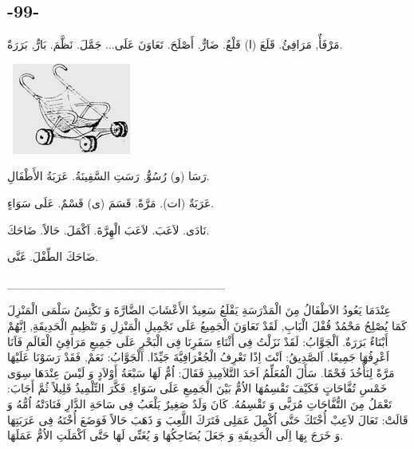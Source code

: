 \documentclass[a5paper]{article}
\begin{document}
\subsection[-99-]{-99-}
مَرْفَأٌ, مَرَافِئُ. قَلَعَ (ا) قَلْعٌ. ضَارٌّ. أَصْلَحَ. تَعَاوَنَ عَلَى... جَمَّلَ. نَظَّمَ. بَارٌّ, بَرَرَةٌ.

\  \includegraphics[width=1.5311in,height=1.1772in]{images/MuhammadBagauddinprettified-img273.png} 

رَسَا (و) رُسُوٌّ. رَسَتِ السَّفِينَةُ. عَرَبَةُ الأَطْفَالِ.

عَرَبَةٌ (ات). مَرَّةً. قَسَمَ (ى) قَسْمٌ. عَلَى سَوَاءٍ.

نَادَى. لاَعَبَ. لاَعَبَ الْهِرَّةَ. اَكْمَلَ. حَالاً. ضَاحَكَ.

ضَاحَكَ الطِّفْلَ. غَنَّى.

\_\_\_\_\_\_\_\_\_\_\_\_\_\_\_\_\_\_\_\_\_\_\_\_\_\_

عِنْدَمَا يَعُودُ الاَطْفَالُ مِنَ الْمَدْرَسَةِ يَقْلَعُ سَعِيدٌ الأَعْشَابَ الضَّارَّةَ وَ تَكْنِسُ سَلْمَى الْمَنْزِلَ كَمَا يُصْلِحُ مَحْمُدٌ قُفْلَ الْبَابِ, لَقَدْ تَعَاوَنَ الْجَمِيعُ عَلَى تَجْمِيلِ الْمَنْزِلِ وَ تَنْظِيمِ الْحَدِيقَةِ, اِنَّهُمْ أَبْنَاءٌ بَرَرَةٌ. اَلْجَوَّابُ: لَقَدْ نَزَلْتُ فِى أَثْنَاءِ سَفَرِنَا فِى الْبَحْرِ عَلَى جَمِيعِ مَرَافِئِ الْعَالَمِ فَاَنَا اَعْرِفُهَا جَمِيعًا. اَلصَّدِيقُ: اَنْتَ اِذًا تَعْرِفُ الْجُغْرَافِيَّةَ جَيِّدًا. اَلْجَوَّابُ: نَعَمْ, فَقَدْ رَسَوْنَا عَلَيْهَا مَرَّةً لِنَأْخُذَ فَحْمًا. سَأَلَ الْمُعَلِّمُ اَحَدَ التَّلاَمِيذِ فَقَالَ: اُمٌّ لَهَا سَبْعَةُ أَوْلاَدٍ وَ لَيْسَ عِنْدَهَا سِوَى خَمْسِ تُفَّاحَاتٍ فَكَيْفَ تَقْسِمُهَا الاُمُّ بَيْنَ الْجَمِيعِ عَلَى سَوَاءٍ. فَكَّرَ التِّلْمِيذُ قَلِيلاً ثُمَّ أَجَابَ: تَعْمَلُ مِنَ التُّفَّاحَاتِ مُرَبًّى وَ تَقْسِمُهُ. كَانَ وَلَدٌ صَغِيرٌ يَلْعَبُ فِى سَاحَةِ الدَّارِ فَنَادَتْهُ اُمُّهُ وَ قَالَتْ: تَعَالَ لاَعِبْ أُخْتَكَ حَتَّى اُكْمِلَ عَمَلِى فَتَرَكَ اللَّعِبَ وَ ذَهَبَ حَالاً فَوَضَعَ أُخْتَهُ فِى عَرَبَتِهَا وَ خَرَجَ بِهَا اِلَى الْحَدِيقَةِ وَ جَعَلَ يُضَاحِكُهَا وَ يُغَنِّى لَهَا حَتَّى اَكْمَلَتِ الاُمُّ عَمَلَهَا.
\end{document}
